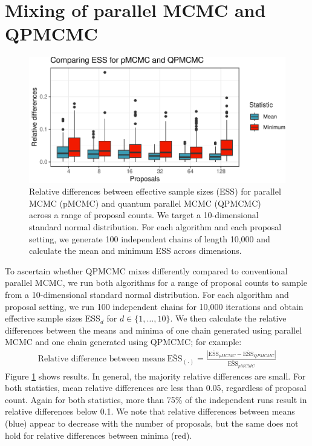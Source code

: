 \documentclass[12pt]{article} %
\begin{document}
\section{Mixing of parallel MCMC and QPMCMC}\label{sec:mixing}

 \begin{figure}[!t]
	\centering
	\includegraphics[width=0.7\linewidth]{pMCMCvsQPMCMC.pdf}
	\caption{Relative differences between effective sample sizes (ESS) for parallel MCMC (pMCMC) and quantum parallel MCMC (QPMCMC) across a range of proposal counts. We target a 10-dimensional standard normal distribution.  For each algorithm and each proposal setting, we generate 100 independent chains of length 10,000 and calculate the mean and minimum ESS across dimensions.}\label{fig:mixing} 
\end{figure}

To ascertain whether QPMCMC mixes differently compared to conventional parallel MCMC, we run both algorithms for a range of proposal counts to sample from a 10-dimensional standard normal distribution. For each algorithm and proposal setting, we run 100 independent chains for 10,000 iterations and obtain effective sample sizes ESS$_d$ for $d \in \{1,\dots,10\}$.   We then calculate the relative differences between the means and minima of one chain generated using parallel MCMC and one chain generated using QPMCMC; for example:
\begin{align*}
	\mbox{Relative difference between means} \: \overline{\mbox{ESS}}_{(\cdot)} = \frac{\left|\overline{\mbox{ESS}}_{pMCMC} - \overline{\mbox{ESS}}_{QPMCMC}\right| }{\overline{\mbox{ESS}}_{pMCMC} }
\end{align*}
Figure \ref{fig:mixing} shows results.  In general, the majority relative differences are small.  For both statistics, mean relative differences are less than 0.05, regardless of proposal count.  Again for both statistics, more than 75\% of the independent runs result in relative differences below 0.1.  We note that relative differences between means (blue) appear to decrease with the number of proposals, but the same does not hold for relative differences between minima (red).
\end{document}
